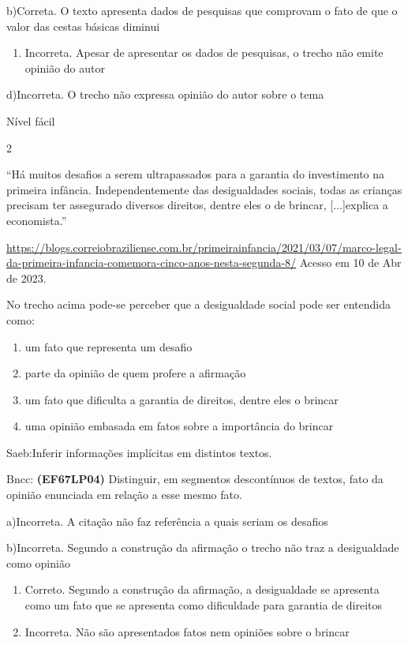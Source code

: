 {{\begin{escolha}
b)Correta. O texto apresenta dados de pesquisas que comprovam o fato de
que o valor das cestas básicas diminui

\begin{enumerate}
\def\labelenumi{\arabic{enumi}.}
\tightlist
\item
  Incorreta. Apesar de apresentar os dados de pesquisas, o trecho não
  emite opinião do autor
\end{enumerate}

d)Incorreta. O trecho não expressa opinião do autor sobre o tema

Nível fácil

\num{2}

``Há muitos desafios a serem ultrapassados para a garantia do
investimento na primeira infância. Independentemente das desigualdades
sociais, todas as crianças precisam ter assegurado diversos direitos,
dentre eles o de brincar, {[}...{]}explica a economista.''

\href{https://blogs.correiobraziliense.com.br/primeirainfancia/2021/03/07/marco-legal-da-primeira-infancia-comemora-cinco-anos-nesta-segunda-8/}{\uline{https://blogs.correiobraziliense.com.br/primeirainfancia/2021/03/07/marco-legal-da-primeira-infancia-comemora-cinco-anos-nesta-segunda-8/}}
Acesso em 10 de Abr de 2023.

No trecho acima pode-se perceber que a desigualdade social pode ser
entendida como:

\begin{enumerate}
\def\labelenumi{\alph{enumi})}
\item
  um fato que representa um desafio
\item
  parte da opinião de quem profere a afirmação
\item
  um fato que dificulta a garantia de direitos, dentre eles o brincar
\item
  uma opinião embasada em fatos sobre a importância do brincar
\end{enumerate}

Saeb:Inferir informações implícitas em distintos textos.

Bncc: \textbf{(EF67LP04)} Distinguir, em segmentos descontínuos de
textos, fato da opinião enunciada em relação a esse mesmo fato.

a)Incorreta. A citação não faz referência a quais seriam os desafios

b)Incorreta. Segundo a construção da afirmação o trecho não traz a
desigualdade como opinião

\begin{enumerate}
\def\labelenumi{\arabic{enumi}.}
\item
  Correto. Segundo a construção da afirmação, a desigualdade se
  apresenta como um fato que se apresenta como dificuldade para garantia
  de direitos
\item
  Incorreta. Não são apresentados fatos nem opiniões sobre o brincar
\end{enumerate}


\end{escolha}}}
